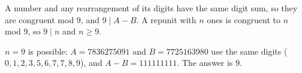 A number and any rearrangement of its digits have the same digit sum, so they are congruent mod $9$, and $9\mid A-B$. A repunit with $n$ ones is congruent to $n$ mod $9$, so $9\mid n$ and $n\ge9$.

$n=9$ is possible: $A=7836275091$ and $B=7725163980$ use the same digits ($0,1,2,3,5,6,7,7,8,9$), and $A-B=111111111$. The answer is $\boxed{9}$.
